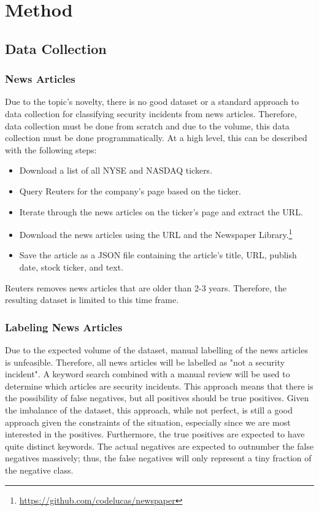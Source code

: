 \chapter{Method}
\label{chap:method}

\section{Data Collection}
\subsection{News Articles}
\label{sec:news}

Due to the topic's novelty, there is no good dataset or a standard approach to data collection for classifying security incidents from news articles. Therefore, data collection must be done from scratch and due to the volume, this data collection must be done programmatically. At a high level, this can be described with the following steps:
\begin{itemize}
    \item Download a list of all NYSE and NASDAQ tickers.
    \item Query Reuters for the company's page based on the ticker.
    \item Iterate through the news articles on the ticker's page and extract the URL.
    \item Download the news articles using the URL and the Newspaper Library.\footnote{\url{https://github.com/codelucas/newspaper}}
    \item Save the article as a JSON file containing the article's title, URL, publish date, stock ticker, and text.
\end{itemize}
Reuters removes news articles that are older than 2-3 years. Therefore, the resulting dataset is limited to this time frame.

\subsection{Labeling News Articles}
Due to the expected volume of the dataset, manual labelling of the news articles is unfeasible. Therefore, all news articles will be labelled as "not a security incident". A keyword search combined with a manual review will be used to determine which articles are security incidents. This approach means that there is the possibility of false negatives, but all positives should be true positives. Given the imbalance of the dataset, this approach, while not perfect, is still a good approach given the constraints of the situation, especially since we are most interested in the positives. Furthermore, the true positives are expected to have quite distinct keywords. The actual negatives are expected to outnumber the false negatives massively; thus, the false negatives will only represent a tiny fraction of the negative class.

